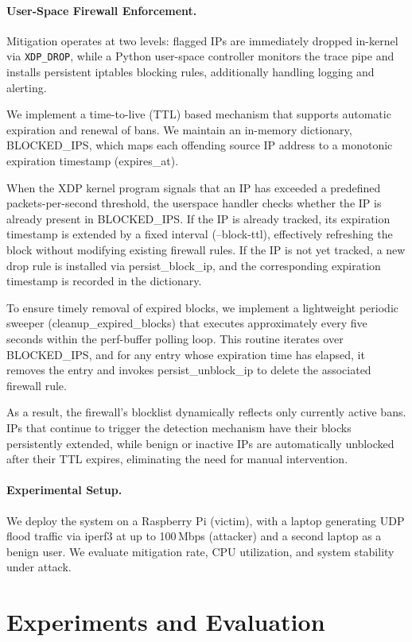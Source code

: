 \documentclass[twocolumn, 10pt]{scrartcl}
\begin{document}
\paragraph{User-Space Firewall Enforcement.}
Mitigation operates at two levels: flagged IPs are immediately dropped in-kernel via \texttt{XDP\_DROP}, while a Python user-space controller monitors the trace pipe and installs persistent iptables blocking rules, additionally handling logging and alerting.

We implement a time-to-live (TTL) based mechanism that supports automatic expiration and renewal of bans. We maintain an in-memory dictionary, BLOCKED\_IPS, which maps each offending source IP address to a monotonic expiration timestamp (expires\_at).

When the XDP kernel program signals that an IP has exceeded a predefined packets-per-second threshold, the userspace handler checks whether the IP is already present in BLOCKED\_IPS. If the IP is already tracked, its expiration timestamp is extended by a fixed interval (--block-ttl), effectively refreshing the block without modifying existing firewall rules. If the IP is not yet tracked, a new drop rule is installed via persist\_block\_ip, and the corresponding expiration timestamp is recorded in the dictionary.

To ensure timely removal of expired blocks, we implement a lightweight periodic sweeper (cleanup\_expired\_blocks) that executes approximately every five seconds within the perf-buffer polling loop. This routine iterates over BLOCKED\_IPS, and for any entry whose expiration time has elapsed, it removes the entry and invokes persist\_unblock\_ip to delete the associated firewall rule.

As a result, the firewall’s blocklist dynamically reflects only currently active bans. IPs that continue to trigger the detection mechanism have their blocks persistently extended, while benign or inactive IPs are automatically unblocked after their TTL expires, eliminating the need for manual intervention.


\paragraph{Experimental Setup.}
We deploy the system on a Raspberry Pi (victim), with a laptop generating UDP flood traffic via iperf3 at up to 100\,Mbps (attacker) and a second laptop as a benign user. We evaluate mitigation rate, CPU utilization, and system stability under attack.
\section{Experiments and Evaluation}
\end{document}

